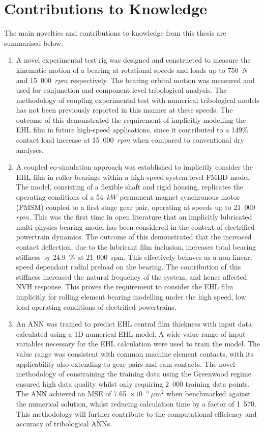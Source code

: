 \section{Contributions to Knowledge} \label{Contribution to Knowledge}

The main novelties and contributions to knowledge from this thesis are summarised below:

\begin{enumerate}
	\item A novel experimental test rig was designed and constructed to measure the kinematic motion of a bearing at rotational speeds and loads up to 750~$N$ and 15~000~$rpm$ respectively. The bearing orbital motion was measured and used for conjunction and component level tribological analysis. The methodology of coupling experimental test with numerical tribological models has not been previously reported in this manner at these speeds. The outcome of this demonstrated the requirement of implicitly modelling the EHL film in future high-speed applications, since it contributed to a 149\% contact load increase at 15~000~$rpm$ when compared to conventional dry analyses.
	
	\item A coupled co-simulation approach was established to implicitly consider the EHL film in roller bearings within a high-speed system-level FMBD model. The model, consisting of a flexible shaft and rigid housing, replicates the operating conditions of a 54~$kW$ permanent magnet synchronous motor (PMSM) coupled to a first stage gear pair, operating at speeds up to 21~000~$rpm$. This was the first time in open literature that an implicitly lubricated multi-physics bearing model has been considered in the context of electrified powertrain dynamics. The outcome of this demonstrated that the increased contact deflection, due to the lubricant film inclusion, increases total bearing stiffness by 24.9~\% at 21~000~rpm. This effectively behaves as a non-linear, speed dependant radial preload on the bearing. The contribution of this stiffness increased the natural frequency of the system, and hence affected NVH response. This proves the requirement to consider the EHL film implicitly for rolling element bearing modelling under the high speed, low load operating conditions of electrified powertrains.
	
	\item An ANN was trained to predict EHL central film thickness with input data calculated using a 1D numerical EHL model. A wide value range of input variables necessary for the EHL calculation were used to train the model. The value range was consistent with common machine element contacts, with its applicability also extending to gear pairs and cam contacts. The novel methodology of constraining the training data using the Greenwood regime ensured high data quality whilst only requiring 2~000 training data points. The ANN achieved an MSE of 7.65~$\times 10^{-5}~\mu \mathrm{m}^2$ when benchmarked against the numerical solution, whilst reducing calculation time by a factor of 1~570. This methodology will further contribute to the computational efficiency and accuracy of tribological ANNs.
	

\end{enumerate}
